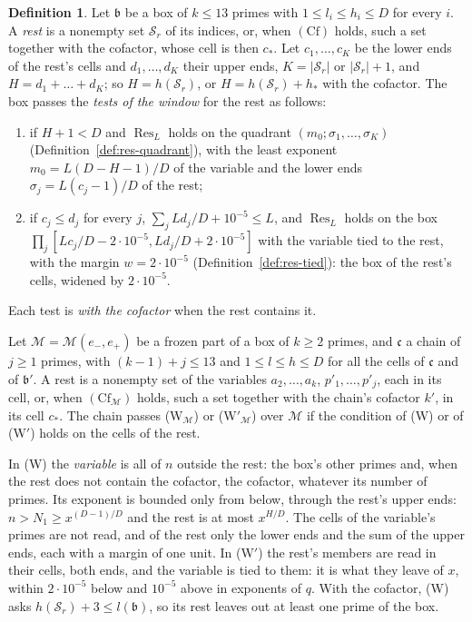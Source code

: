 \documentclass[11pt]{article}
\theoremstyle{definition}
\newtheorem{definition}[theorem]{Definition}
\begin{document}
\begin{definition}\label{def:window-tests}
Let $\mathfrak b$ be a box of $k \le 13$ primes with $1 \le l_i \le h_i \le D$ for every $i$. A \emph{rest} is a
nonempty set $\mathcal S_r$ of its indices, or, when $(\mathrm{Cf})$ holds, such a set together with the cofactor, whose
cell is then $c_*$. Let $c_1, \dots, c_K$ be the lower ends of the rest's cells and $d_1, \dots, d_K$ their upper ends,
$K = |\mathcal S_r|$ or $|\mathcal S_r| + 1$, and $H = d_1 + \dots + d_K$; so $H = h(\mathcal S_r)$, or $H =
h(\mathcal S_r) + h_*$ with the cofactor. The box passes the \emph{tests of the window} for the rest as follows:
\begin{enumerate}
\item[(W)] if $H + 1 < D$ and $\operatorname{Res}_L$ holds on the quadrant $(m_0; \sigma_1, \dots, \sigma_K)$
  (Definition~\ref{def:res-quadrant}), with the least exponent $m_0 = L(D - H - 1)/D$ of the variable and the lower
  ends $\sigma_j = L(c_j - 1)/D$ of the rest;
\item[(W$'$)] if $c_j \le d_j$ for every $j$, $\sum_j Ld_j/D + 10^{-5} \le L$, and $\operatorname{Res}_L$ holds on the
  box $\prod_j [Lc_j/D - 2 \cdot 10^{-5}, Ld_j/D + 2 \cdot 10^{-5}]$ with the variable tied to the rest, with the margin
  $w = 2 \cdot 10^{-5}$ (Definition~\ref{def:res-tied}): the box of the rest's cells, widened by $2 \cdot 10^{-5}$.
\end{enumerate}
Each test is \emph{with the cofactor} when the rest contains it.

Let $\mathcal M = \mathcal M(e_-, e_+)$ be a frozen
part of a box of $k \ge 2$ primes, and $\mathfrak c$ a chain of $j \ge 1$ primes, with $(k - 1) + j \le 13$ and $1 \le
l \le h \le D$ for all the cells of $\mathfrak c$ and of $\mathfrak b'$. A rest is a nonempty set of the variables
$a_2, \dots, a_k$, $p'_1, \dots, p'_j$, each in its cell, or, when $(\mathrm{Cf}_{\mathcal M})$ holds, such a set
together
with the chain's cofactor $k'$, in its cell $c_*$. The chain passes (W$_{\mathcal M}$) or (W$'_{\mathcal M}$) over
$\mathcal M$ if the condition of (W) or of (W$'$) holds on the cells of the rest.
\end{definition}

In (W) the \emph{variable} is all of $n$ outside the rest: the box's other primes and, when the rest does not contain
the cofactor, the
cofactor, whatever its number of primes. Its exponent is bounded only from below, through the rest's upper ends: $n >
N_1 \ge x^{(D - 1)/D}$ and the rest is at most $x^{H/D}$. The cells of the variable's primes are not read, and of the
rest only the lower ends and the sum of the upper ends, each with a margin of one unit. In (W$'$) the rest's members
are read in their cells, both ends, and the variable is tied to them: it is what they leave of $x$, within $2 \cdot
10^{-5}$ below and $10^{-5}$ above in exponents of $q$. With the cofactor, (W) asks $h(\mathcal S_r) + 3 \le
l(\mathfrak b)$, so its rest leaves out at least one prime of the box.
\end{document}
